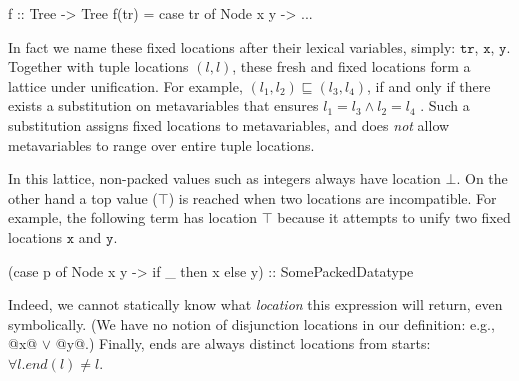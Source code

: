 \documentclass[a4paper,english]{lipics-v2016}
\newcommand{\fresh}[1]{\ensuremath{#1}}
\newcommand{\fixed}[1]{\ensuremath{\texttt{#1}}}
\newcommand{\freshA}{\fresh{\alpha}}
\begin{document}
\begin{code}
f :: Tree -> Tree
f(tr) = case tr of Node x y -> ...
\end{code}

In fact we name these fixed locations after their lexical variables, simply:
\fixed{tr}, \fixed{x}, \fixed{y}.  Together with tuple locations $(l,l)$, these
fresh and fixed locations form a lattice under unification.
For example, $(l_1,l_2)\sqsubseteq (l_3,l_4)$, if and only if there exists a
substitution on metavariables that ensures $l_1 = l_3 \wedge l_2 = l_4$ .
%
Such a substitution assigns fixed locations to metavariables, and does {\em not}
allow metavariables to range over entire tuple locations.  


In this lattice, non-packed values such as integers always have location $\bot$.
On the other hand a
top value ($\top$) is reached
when two locations are incompatible.  For example, the following term has
location $\top$ because it attempts to unify two fixed locations \fixed{x} and \fixed{y}.

\begin{code}
(case p of Node x y -> if _ then x else y) :: SomePackedDatatype
\end{code}

Indeed, we cannot statically know what {\em location} this expression will
return, even symbolically.  (We have no notion of disjunction locations in our
definition: e.g., @x@ $\vee$ @y@.)
Finally, ends are always distinct locations from starts: $\forall l . end(l) \neq l$.


\end{document}
